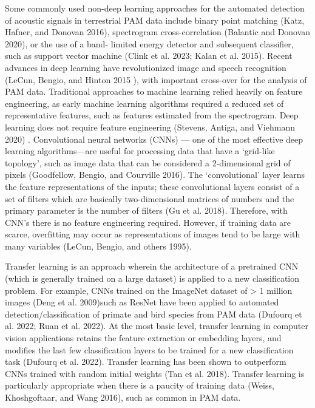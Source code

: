 \documentclass[fleqn,10pt,lineno]{wlpeerj} %
\begin{document}
Some commonly used non-deep learning approaches for the automated
detection of acoustic signals in terrestrial PAM data include binary
point matching (Katz, Hafner, and Donovan 2016), spectrogram
cross-correlation (Balantic and Donovan 2020), or the use of a band-
limited energy detector and subsequent classifier, such as support
vector machine (Clink et al. 2023; Kalan et al. 2015). Recent advances
in deep learning have revolutionized image and speech recognition
(LeCun, Bengio, and Hinton 2015 ), with important cross-over for the
analysis of PAM data. Traditional approaches to machine learning relied
heavily on feature engineering, as early machine learning algorithms
required a reduced set of representative features, such as features
estimated from the spectrogram. Deep learning does not require feature
engineering (Stevens, Antiga, and Viehmann 2020) . Convolutional neural
networks (CNNs) --- one of the most effective deep learning
algorithms---are useful for processing data that have a `grid-like
topology', such as image data that can be considered a 2-dimensional
grid of pixels (Goodfellow, Bengio, and Courville 2016). The
`convolutional' layer learns the feature representations of the inputs;
these convolutional layers consist of a set of filters which are
basically two-dimensional matrices of numbers and the primary parameter
is the number of filters (Gu et al. 2018). Therefore, with CNN's there
is no feature engineering required. However, if training data are
scarce, overfitting may occur as representations of images tend to be
large with many variables (LeCun, Bengio, and others 1995).

Transfer learning is an approach wherein the architecture of a
pretrained CNN (which is generally trained on a large dataset) is
applied to a new classification problem. For example, CNNs trained on
the ImageNet dataset of \textgreater{} 1 million images (Deng et al.
2009)such as ResNet have been applied to automated
detection/classification of primate and bird species from PAM data
(Dufourq et al. 2022; Ruan et al. 2022). At the most basic level,
transfer learning in computer vision applications retains the feature
extraction or embedding layers, and modifies the last few classification
layers to be trained for a new classification task (Dufourq et al.
2022). Transfer learning has been shown to outperform CNNs trained with
random initial weights (Tan et al. 2018). Transfer learning is
particularly appropriate when there is a paucity of training data
(Weiss, Khoshgoftaar, and Wang 2016), such as common in PAM data.
\end{document}
